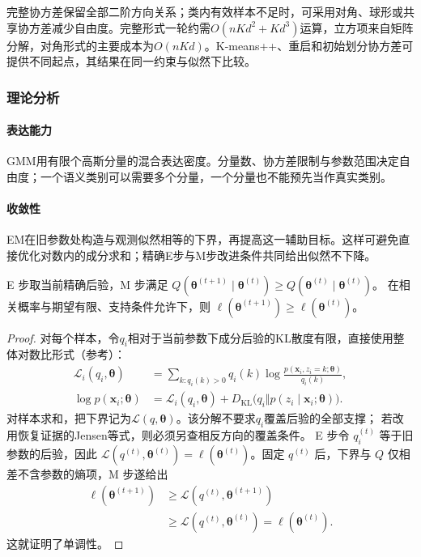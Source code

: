 完整协方差保留全部二阶方向关系；类内有效样本不足时，可采用对角、球形或共享协方差减少自由度。完整形式一轮约需$O(nKd^2+Kd^3)$运算，立方项来自矩阵分解，对角形式的主要成本为$O(nKd)$。K-means++、重启和初始划分协方差可提供不同起点，其结果在同一约束与似然下比较。

\subsubsection{理论分析}

\paragraph{表达能力}
GMM用有限个高斯分量的混合表达密度。分量数、协方差限制与参数范围决定自由度；一个语义类别可以需要多个分量，一个分量也不能预先当作真实类别。

\paragraph{收敛性}
EM在旧参数处构造与观测似然相等的下界，再提高这一辅助目标。这样可避免直接优化对数内的成分求和；精确E步与M步改进条件共同给出似然不下降。

\begin{theorem}[EM 的似然单调性]
 \label{thm:clustering-em}
 E 步取当前精确后验，M 步满足
 $Q(\bm{\theta}^{(t+1)}\mid\bm{\theta}^{(t)})
 \geq Q(\bm{\theta}^{(t)}\mid\bm{\theta}^{(t)})$。
 在相关概率与期望有限、支持条件允许下，则
 $\ell(\bm{\theta}^{(t+1)})\geq\ell(\bm{\theta}^{(t)})$。
\end{theorem}
\begin{proof}
对每个样本，令$q_i$相对于当前参数下成分后验的KL散度有限，直接使用整体对数比形式（参考）：
\[
 \begin{aligned}
 \mathcal L_i(q_i,\bm\theta)
 &=\sum_{k:q_i(k)>0}q_i(k)
    \log\frac{p(\bm x_i,z_i=k;\bm\theta)}{q_i(k)},\\
 \log p(\bm x_i;\bm\theta)
 &=\mathcal L_i(q_i,\bm\theta)
   +D_{\mathrm{KL}}\bigl(q_i\Vert p(z_i\mid\bm x_i;\bm\theta)\bigr).
 \end{aligned}
\]
对样本求和，把下界记为$\mathcal L(q,\bm\theta)$。该分解不要求$q_i$覆盖后验的全部支撑；
若改用恢复证据的Jensen等式，则必须另查相反方向的覆盖条件。
E 步令 $q_i^{(t)}$ 等于旧参数的后验，因此 $\mathcal{L}(q^{(t)},\bm{\theta}^{(t)})=\ell(\bm{\theta}^{(t)})$。固定 $q^{(t)}$ 后，下界与 $Q$ 仅相差不含参数的熵项，M 步遂给出
\[
 \begin{aligned}
 \ell(\bm{\theta}^{(t+1)})
 &\geq\mathcal{L}(q^{(t)},\bm{\theta}^{(t+1)})\\
 &\geq\mathcal{L}(q^{(t)},\bm{\theta}^{(t)})
 =\ell(\bm{\theta}^{(t)}).
 \end{aligned}
\]
这就证明了单调性。
\end{proof}

